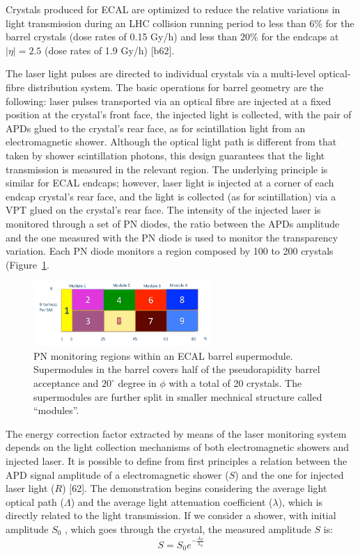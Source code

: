 Crystals produced for ECAL are optimized to reduce the relative variations in light transmission
during an LHC collision running period to less than $6\%$ for the barrel
crystals (dose rates of 0.15 Gy/h) and less than $20\%$ for the endcaps at $|\eta| = 2.5$ (dose rates of
1.9 Gy/h) [b62].

The laser light pulses are directed to individual crystals via a multi-level optical-fibre distribution
system. The basic operations for barrel geometry are the following: laser pulses transported via
an optical fibre are injected at a fixed position at the crystal’s front face, the injected light is
collected, with the pair of APDs glued to the crystal’s rear face, as for scintillation light from an
electromagnetic shower. Although the optical light path is different from that taken by shower
scintillation photons, this design guarantees that the light transmission is measured in the relevant region.
The underlying principle is similar for ECAL endcaps; however, laser light is injected
at a corner of each endcap crystal’s rear face, and the light is collected (as for scintillation) via
a VPT glued on the crystal’s rear face. The intensity of the injected laser is monitored through a set of PN diodes,
the ratio between the APDs amplitude and the one measured with
the PN diode is used to monitor the transparency variation.
Each PN diode monitors a region composed by 100 to 200 crystals (Figure~\ref{fig:laser_scheme}.

\begin{figure}[hb!]
  \centering
  \includegraphics[width = 0.6\textwidth]{figures/ecal/pn_regions.png}
  \caption{PN monitoring regions within an ECAL barrel supermodule. Supermodules in the barrel
    covers half of the pseudorapidity barrel acceptance and $20^{\circ}$ degree in $\phi$ with
    a total of 20 crystals. The supermodules are further split in smaller mechnical structure called ``modules''.}
  \label{fig:laser_scheme}
\end{figure}

The energy correction factor extracted by means of the laser monitoring system depends on
the light collection mechanisms of both electromagnetic showers and injected laser.
It is possible to define from first principles a relation between
the APD signal amplitude of a electromagnetic shower ($S$) and the one for injected laser light ($R$) [62].
The demonstration begins considering the average light optical path ($\Lambda$) and the average light attenuation
coefficient ($\lambda$), which is directly related to the light transmission. If we consider a shower, with
initial amplitude $S_0$ , which goes through the crystal, the measured amplitude $S$ is:
\[
  S = S_0 e^{-\frac{\Lambda_S}{\lambda_S}}
\]

